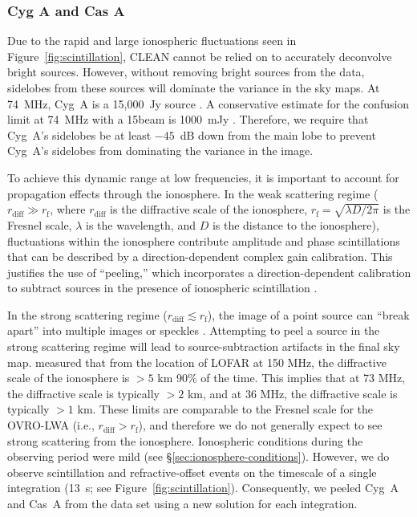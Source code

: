 \documentclass[twocolumn]{aastex61}
\begin{document}
\subsubsection{Cyg A and Cas A}

Due to the rapid and large ionospheric fluctuations seen in Figure~\ref{fig:scintillation}, CLEAN
cannot be relied on to accurately deconvolve bright sources.  However, without removing bright
sources from the data, sidelobes from these sources will dominate the variance in the sky maps.  At
74~MHz, Cyg~A is a 15,000~Jy source \citep{1977A&A....61...99B}. A conservative estimate for the
confusion limit at 74~MHz with a 15\arcmin beam is 1000~mJy \citep{2014MNRAS.440..327L}. Therefore,
we require that Cyg~A's sidelobes be at least $-45$~dB down from the main lobe to prevent Cyg~A's
sidelobes from dominating the variance in the image.

To achieve this dynamic range at low frequencies, it is important to account for propagation effects
through the ionosphere. In the weak scattering regime ($r_\text{diff} \gg r_\text{f}$, where
$r_\text{diff}$ is the diffractive scale of the ionosphere, $r_\text{f} = \sqrt{\lambda D / 2\pi}$
is the Fresnel scale, $\lambda$ is the wavelength, and $D$ is the distance to the ionosphere),
fluctuations within the ionosphere contribute amplitude and phase scintillations that can be
described by a direction-dependent complex gain calibration. This justifies the use of ``peeling,''
which incorporates a direction-dependent calibration to subtract sources in the presence of
ionospheric scintillation \citep[e.g.,][]{2008ISTSP...2..707M, 2015MNRAS.449.2668S}.

In the strong scattering regime ($r_\text{diff} \lesssim r_\text{f}$), the image of a point source
can ``break apart'' into multiple images or speckles \citep{2015MNRAS.453..925V}.  Attempting to
peel a source in the strong scattering regime will lead to source-subtraction artifacts in the final
sky map.  \citet{2016RaSc...51..927M} measured that from the location of LOFAR at 150 MHz, the
diffractive scale of the ionosphere is $>5$ km 90\% of the time. This implies that at 73 MHz, the
diffractive scale is typically $>2$ km, and at 36 MHz, the diffractive scale is typically $>1$ km.
These limits are comparable to the Fresnel scale for the OVRO-LWA (i.e., $r_\text{diff} >
r_\text{f}$), and therefore we do not generally expect to see strong scattering from the ionosphere.
Ionospheric conditions during the observing period were mild (see
\S\ref{sec:ionosphere-conditions}). However, we do observe scintillation and refractive-offset
events on the timescale of a single integration (13~s; see Figure~\ref{fig:scintillation}).
Consequently, we peeled Cyg~A and Cas~A from the data set using a new solution for each integration.
\end{document}
